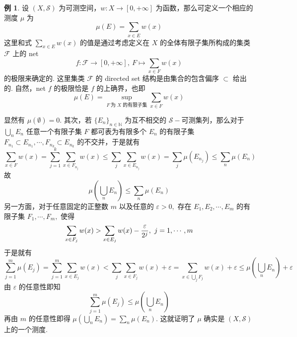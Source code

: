\documentclass[12pt, a4paper, oneside]{book}
\numberwithin{figure}{section}
\theoremstyle{definition}
\newtheorem{example}[theorem]{例}
\begin{document}
\begin{example}
    设 $(X,\mathcal S)$ 为可测空间，$w:X\to [0,+\infty]$ 为函数，那么可定义一个相应的测度 $\mu$ 为
    \begin{equation}
        \mu(E)=\sum_{x\in E}w(x)
    \end{equation}
这里和式 $\sum_{x\in E}w(x)$ 的值是通过考虑定义在 $X$ 的全体有限子集所构成的集类 $\mathcal F$ 上的 net 
\begin{equation}
    f:\mathcal F\to [0,+\infty],\ F\mapsto \sum_{x\in F}w(x)
\end{equation}
的极限来确定的. 这里集类 $\mathcal F$ 的 directed set 结构是由集合的包含偏序 $\subset$ 给出的. 自然，net $f$ 的极限恰是 $f$ 的上确界，也即
\begin{equation}
    \mu(E)=\sup_{F\ \text{为 $X$ 的有限子集}}\sum_{x\in F}w(x)
\end{equation}
\end{example}

显然有 $\mu(\emptyset)=0.$ 其次，若 $\{E_n\}_{n\in\mathbb N}$ 为互不相交的 $\mathcal S-$可测集列，那么对于 $\bigcup_n E_n$ 任意一个有限子集 $F$ 都可表为有限多个 $E_n$ 的有限子集 $F_{n_1}\subset E_{n_1},\cdots,F_{n_k}\subset E_{n_k}$ 的不交并，于是就有 
\begin{equation}
    \sum_{x\in F}w(x)=\sum_{j=1}^k \sum_{x\in F_{n_j}}w(x)\leq \sum_j \sum_{x\in E_{n_j}}w(x) = \sum_j \mu(E_{n_j})\leq \sum_n \mu(E_n)
\end{equation}
故 
\begin{equation}
    \mu\left(\bigcup_n E_n\right)\leq \sum_n \mu(E_n)
\end{equation}
另一方面，对于任意固定的正整数 $m$ 以及任意的 $\varepsilon>0,$ 存在 $E_1,E_2,\cdots,E_m$ 的有限子集 $F_1,\cdots,F_m,$ 使得
\begin{equation}
    \sum_{x\in F_j}w(x)> \sum_{x\in E_j}w(x) - {\varepsilon\over 2^j},\ j=1,\cdots,m
\end{equation}
于是就有
\begin{equation}
    \sum_{j=1}^m\mu(E_j)=\sum_{j=1}^m \sum_{x\in E_j}w(x)<\sum_{j}\sum_{x\in F_j}w(x)+\varepsilon=\sum_{x\in\bigcup_j F_j} w(x)+\varepsilon\leq \mu\left(\bigcup_n E_n\right)+\varepsilon
\end{equation}
由 $\varepsilon$ 的任意性即知
\begin{equation}
    \sum_{j=1}^m \mu(E_j)\leq \mu\left(\bigcup_n E_n\right)
\end{equation}
再由 $m$ 的任意性即得 $\mu\left(\bigcup_n E_n\right)=\sum_n \mu(E_n).$ 这就证明了 $\mu$ 确实是 $(X,\mathcal S)$ 上的一个测度.
\end{document}
